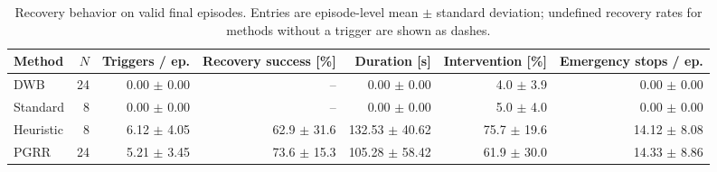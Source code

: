 \begin{table}[t]
\caption{Recovery behavior on valid final episodes. Entries are episode-level mean $\pm$
standard deviation; undefined recovery rates for methods without a trigger are shown as dashes.}
\label{tab:recovery-metrics}
\centering
\small
\begin{tabular}{lrrrrrr}
\toprule
Method & $N$ & Triggers / ep. & Recovery success [\%] & Duration [s] & Intervention [\%]
& Emergency stops / ep. \\
\midrule
DWB & 24 & 0.00 $\pm$ 0.00 & -- & 0.00 $\pm$ 0.00 & 4.0 $\pm$ 3.9 & 0.00 $\pm$ 0.00 \\
Standard & 8 & 0.00 $\pm$ 0.00 & -- & 0.00 $\pm$ 0.00 & 5.0 $\pm$ 4.0 & 0.00 $\pm$ 0.00 \\
Heuristic & 8 & 6.12 $\pm$ 4.05 & 62.9 $\pm$ 31.6 & 132.53 $\pm$ 40.62 & 75.7 $\pm$ 19.6 & 14.12 $\pm$ 8.08 \\
PGRR & 24 & 5.21 $\pm$ 3.45 & 73.6 $\pm$ 15.3 & 105.28 $\pm$ 58.42 & 61.9 $\pm$ 30.0 & 14.33 $\pm$ 8.86 \\
\bottomrule
\end{tabular}
\end{table}

